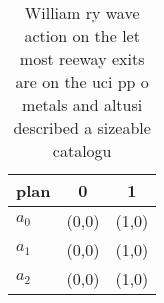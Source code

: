 \documentclass[a4paper]{article}
\begin{document}
\begin{table}
\begin{adjustbox}{width=0.7\columnwidth}
\begin{tabular}{|l|l|l|}
\hline
\textbf{plan} & \multicolumn{1}{c|}{\textbf{0}} & \multicolumn{1}{c|}{\textbf{1}} \\ \hline
\textbf{$a_0$}  & (0,0) & (1,0) \\ \hline
\textbf{$a_1$}  & (0,0) & (1,0) \\ \hline
\textbf{$a_2$}  & (0,0) & (1,0) \\ \hline
\end{tabular}
\end{adjustbox}
\caption{William ry wave action on the let most reeway exits are on the uci pp o metals and altusi described a sizeable catalogu
}
\end{table}
\end{document}
